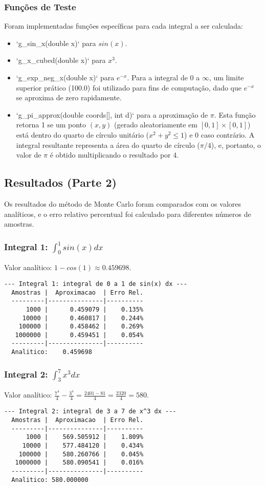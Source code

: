 \documentclass{article}
\begin{document}
\subsubsection{Funções de Teste}
Foram implementadas funções específicas para cada integral a ser calculada:
\begin{itemize}
    \item `g\_sin\_x(double x)` para $sin(x)$.
    \item `g\_x\_cubed(double x)` para $x^3$.
    \item `g\_exp\_neg\_x(double x)` para $e^{-x}$. Para a integral de $0$ a $\infty$, um limite superior prático (100.0) foi utilizado para fins de computação, dado que $e^{-x}$ se aproxima de zero rapidamente.
    \item `g\_pi\_approx(double coords[], int d)` para a aproximação de $\pi$. Esta função retorna 1 se um ponto $(x,y)$ (gerado aleatoriamente em $[0,1]\times[0,1]$) está dentro do quarto de círculo unitário ($x^2+y^2 \le 1$) e 0 caso contrário. A integral resultante representa a área do quarto de círculo ($\pi/4$), e, portanto, o valor de $\pi$ é obtido multiplicando o resultado por 4.
\end{itemize}

\subsection{Resultados (Parte 2)}
Os resultados do método de Monte Carlo foram comparados com os valores analíticos, e o erro relativo percentual foi calculado para diferentes números de amostras.

\subsubsection{Integral 1: $\int_{0}^{1}sin(x)dx$}
Valor analítico: $1 - cos(1) \approx 0.459698$.
\begin{verbatim}
--- Integral 1: integral de 0 a 1 de sin(x) dx ---
  Amostras |  Aproximacao  | Erro Rel.
  ---------|---------------|----------
      1000 |      0.459079 |    0.135%
     10000 |      0.460817 |    0.244%
    100000 |      0.458462 |    0.269%
   1000000 |      0.459451 |    0.054%
  ---------|---------------|----------
  Analitico:    0.459698
\end{verbatim}

\subsubsection{Integral 2: $\int_{3}^{7}x^3dx$}
Valor analítico: $\frac{7^4}{4} - \frac{3^4}{4} = \frac{2401 - 81}{4} = \frac{2320}{4} = 580$.
\begin{verbatim}
--- Integral 2: integral de 3 a 7 de x^3 dx ---
  Amostras |  Aproximacao  | Erro Rel.
  ---------|---------------|----------
      1000 |    569.505912 |    1.809%
     10000 |    577.484120 |    0.434%
    100000 |    580.260766 |    0.045%
   1000000 |    580.090541 |    0.016%
  ---------|---------------|----------
  Analitico: 580.000000
\end{verbatim}
\end{document}
